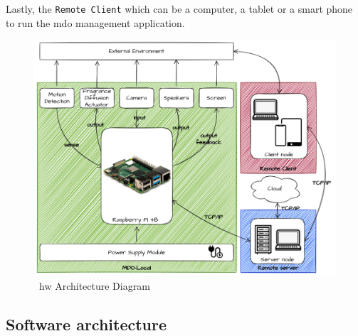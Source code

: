 Lastly, the \texttt{Remote Client} which can be a computer, a tablet or a smart phone to run the \gls{mdo} management application.
%
\begin{figure}
\centering
    \includegraphics[width=0.9\columnwidth]{./img/HW_Architecture.png}
  \caption{~\gls{hw} Architecture Diagram}%
\label{fig:hw-arch}
\end{figure}
%
%
\subsection{Software architecture}
\label{sec:softw-arch}



